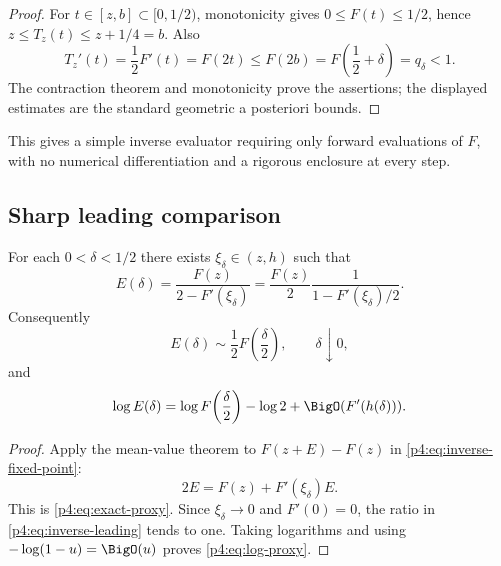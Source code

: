 \documentclass[11pt]{article}
\numberwithin{equation}{section}
\theoremstyle{definition}
\theoremstyle{remark}
\begin{document}
\begin{proof}
For $t\in[z,b]\subset[0,1/2)$, monotonicity gives $0\le F(t)\le1/2$, hence
$z\le T_z(t)\le z+1/4=b$.  Also
\[
 T_z'(t)=\frac12F'(t)=F(2t)
 \le F(2b)=F\!\left(\frac12+\delta\right)=q_\delta<1.
\]
The contraction theorem and monotonicity prove the assertions; the displayed estimates are the standard geometric a posteriori bounds.
\end{proof}

This gives a simple inverse evaluator requiring only forward evaluations of $F$, with no numerical differentiation and a rigorous enclosure at every step.

\subsection{Sharp leading comparison}
\begin{proposition}
\label{p4:prop:inverse-proxy}
For each $0<\delta<1/2$ there exists $\xi_\delta\in(z,h)$ such that
\begin{equation}
 E(\delta)=\frac{F(z)}{2-F'(\xi_\delta)}
 =\frac{F(z)}2\frac1{1-F'(\xi_\delta)/2}.
 \label{p4:eq:exact-proxy}
\end{equation}
Consequently
\begin{equation}
 E(\delta)\sim\frac12F\!\left(\frac\delta2\right),
 \qquad \delta\downarrow0,
 \label{p4:eq:inverse-leading}
\end{equation}
and
\begin{equation}
 \log E(\delta)
 =\log F\!\left(\frac\delta2\right)-\log2
  +\BigO(F'(h(\delta))).
 \label{p4:eq:log-proxy}
\end{equation}
\end{proposition}

\begin{proof}
Apply the mean-value theorem to $F(z+E)-F(z)$ in \eqref{p4:eq:inverse-fixed-point}:
\[
 2E=F(z)+F'(\xi_\delta)E.
\]
This is \eqref{p4:eq:exact-proxy}.  Since $\xi_\delta\to0$ and $F'(0)=0$, the ratio in \eqref{p4:eq:inverse-leading} tends to one.  Taking logarithms and using $-\log(1-u)=\BigO(u)$ proves \eqref{p4:eq:log-proxy}.
\end{proof}
\end{document}
